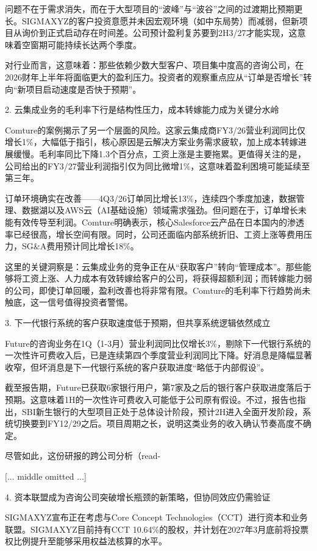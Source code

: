 \documentclass[11pt]{ctexart}
\begin{document}
问题不在于需求消失，而在于大型项目的“波峰”与“波谷”之间的过渡期比预期更长。SIGMAXYZ的客户投资意愿并未因宏观环境（如中东局势）而减弱，但新项目从询价到正式启动存在时间差。公司预计盈利复苏要到2H3/27才能实现，这意味着空窗期可能持续长达两个季度。

对行业而言，这意味着：那些依赖少数大型客户、项目集中度高的咨询公司，在2026财年上半年将面临更大的盈利压力。投资者的观察重点应从“订单是否增长”转向“新项目启动速度是否快于预期”。

2. 云集成业务的毛利率下行是结构性压力，成本转嫁能力成为关键分水岭

Comture的案例揭示了另一个层面的风险。这家云集成商FY3/26营业利润同比仅增长1\%，大幅低于指引，核心原因是云解决方案业务需求疲软，加上成本转嫁进展缓慢。毛利率同比下降1.3个百分点，工资上涨是主要拖累。更值得关注的是，公司给出的FY3/27营业利润指引仅为同比微增1\%，这意味着盈利困境可能延续至第三年。

订单环境确实在改善——4Q3/26订单同比增长13\%，连续四个季度加速，数据管理、数据湖以及AWS云（AI基础设施）领域需求强劲。但问题在于，订单增长未能有效传导至利润。Comture明确表示，核心Salesforce云产品在日本国内的渗透率已经很高，增长空间有限。同时，公司还面临内部系统折旧、工资上涨等费用压力，SG\&A费用预计同比增长18\%。

这里的关键洞察是：云集成业务的竞争正在从“获取客户”转向“管理成本”。那些能够将工资上涨、人力成本有效转嫁给客户的公司，将获得超额利润；而转嫁能力弱的公司，即使订单回暖，盈利改善也将非常有限。Comture的毛利率下行趋势尚未触底，这一信号值得投资者警惕。

3. 下一代银行系统的客户获取速度低于预期，但共享系统逻辑依然成立

Future的咨询业务在1Q（1-3月）营业利润同比仅增长3\%，剔除下一代银行系统的一次性许可费收入后，已是连续第四个季度营业利润同比下降。好消息是降幅显著收窄，但坏消息是下一代银行系统的客户获取进度“略低于内部假设”。

截至报告期，Future已获取6家银行用户，第7家及之后的银行客户获取进度落后于预期。这意味着1H的一次性许可费收入可能低于公司原有假设。不过，报告也指出，SBI新生银行的大型项目正处于总体设计阶段，预计2H进入全面开发阶段，系统切换要到FY12/29之后。项目周期之长，说明这类业务的收入确认节奏高度不确定。

尽管如此，这份研报的跨公司分析（read-

[... middle omitted ...]



4. 资本联盟成为咨询公司突破增长瓶颈的新策略，但协同效应仍需验证

SIGMAXYZ宣布正在考虑与Core Concept Technologies（CCT）进行资本和业务联盟。SIGMAXYZ目前持有CCT 10.64\%的股权，并计划在2027年3月底前将投票权比例提升至能够采用权益法核算的水平。
\end{document}
